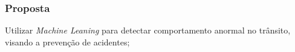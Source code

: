 \begin{frame}
	\frametitle{Proposta}
	Utilizar \textit{Machine Leaning} para detectar 
	comportamento anormal no trânsito, visando a
	prevenção de acidentes;
\end{frame}